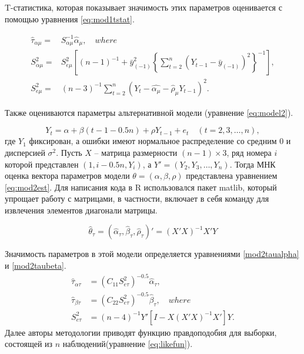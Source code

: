 \documentclass[a4paper,12pt]{article}
\begin{document}
T-статистика, которая показывает значимость этих параметров оценивается с помощью уравнения \ref{eq:mod1tstat}.

\begin{align}
  \label{eq:mod1tstat}
  \hat{\tau}_{\alpha\mu}=&S^{-1}_{\alpha\mu}\hat{\alpha}_\mu,\quad
  where\\
  S^2_{\alpha\mu}=&S^2_{e\mu}
  \left[ (n-1)^{-1}+\bar{y}^2_{(-1)}
  \left\{
  \sum_{t=2}^{n}(Y_{t-1}-\bar{y}_{(-1)})^2\right\}^{-1}\right],\\
  S^2_{e\mu}=&(n-3)^{-1}\sum_{t=2}^{n}(Y_t-\hat{\alpha_\mu}-\hat{\rho}_\mu Y_{t-1})^2.
\end{align}

Также оцениваются параметры альтернативной модели (уравнение \ref{eq:model2}).

\begin{equation}
  \label{eq:model2}
  Y_t=\alpha+\beta(t-1-0.5n)+\rho Y_{t-1}+e_t\quad (t=2,3,\ldots,n),
\end{equation}
где $Y_1$ фиксирован, а ошибки имеют нормальное распределение со средним 0 и дисперсией $\sigma^2$. Пусть $X$ -- матрица размерности $(n-1)\times 3$, ряд номера $i$ которой представлен $(1, i-0.5n, Y_i)$, а $Y'=(Y_2,Y_3,\ldots,Y_n)$. Тогда МНК оценка вектора параметров модели $\theta=(\alpha,\beta,\rho)$ представлена уравнением \ref{eq:mod2est}. Для написания кода в R использовался пакет matlib, который упрощает работу с матрицами, в частности, включает в себя команду для извлечения элементов диагонали матрицы.

\begin{equation}
  \label{eq:mod2est}
  \hat{\theta}_\tau=(\hat{\alpha}_\tau,\hat{\beta}_\tau,\hat{\rho}_\tau)'=(X'X)^{-1}X'Y
\end{equation}

Значимость параметров в этой модели определяется уравнениями \ref{mod2taualpha} и \ref{mod2taubeta}.
\begin{align}
  \label{mod2taualpha}
  \hat{\tau}_{\alpha\tau}&=(C_{11}S^2_{e\tau})^{-0.5}\hat{\alpha}_\tau,\\
  \label{mod2taubeta}
  \hat{\tau}_{\beta\tau}&=(C_{22}S^2_{e\tau})^{-0.5}\hat{\beta}_\tau,\quad where\\
  S^2_{e\tau}&=(n-4)^{-1}Y'\left[I-X(X'X)^{-1}X'\right]Y.
\end{align}
Далее авторы методологии приводят функцию правдоподобия для выборки, состоящей из $n$ наблюдений(уравнение \ref{eq:likefun}).
\end{document}
